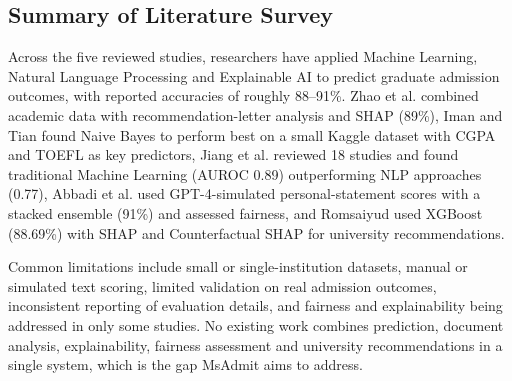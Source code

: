 \subsection{Summary of Literature Survey}

Across the five reviewed studies, researchers have applied Machine Learning, Natural Language Processing and Explainable AI to predict graduate admission outcomes, with reported accuracies of roughly 88--91\%. Zhao et al. combined academic data with recommendation-letter analysis and SHAP (89\%), Iman and Tian found Naive Bayes to perform best on a small Kaggle dataset with CGPA and TOEFL as key predictors, Jiang et al. reviewed 18 studies and found traditional Machine Learning (AUROC 0.89) outperforming NLP approaches (0.77), Abbadi et al. used GPT-4-simulated personal-statement scores with a stacked ensemble (91\%) and assessed fairness, and Romsaiyud used XGBoost (88.69\%) with SHAP and Counterfactual SHAP for university recommendations.

Common limitations include small or single-institution datasets, manual or simulated text scoring, limited validation on real admission outcomes, inconsistent reporting of evaluation details, and fairness and explainability being addressed in only some studies. No existing work combines prediction, document analysis, explainability, fairness assessment and university recommendations in a single system, which is the gap MsAdmit aims to address.

